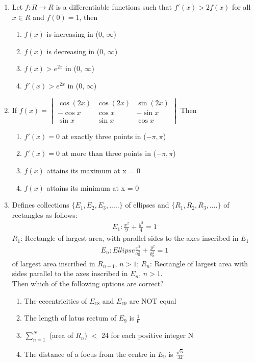 \begin{enumerate}[label=\arabic*.,ref=\thesubsection.\theenumi]
\item Let $f: R \to R$ is a differentiable functions such that $f'(x) > 2f(x)$ for all $x \in R$ and $f(0) = 1$, then 
\begin{enumerate}
\item $f(x)$ is increasing in (0, $\infty$)
\item $f(x)$ is decreasing in (0, $\infty$)
\item $f(x) >  e^{2x}$ in (0, $\infty$)
\item $f'(x) > e^{2x}$ in (0, $\infty$)
\end{enumerate}

\item If  
$f(x) = 
\begin{vmatrix}
\cos(2x) & \cos(2x) & \sin (2x) \\ 
-\cos x & \cos x & -\sin x  \\
\sin x & \sin x& \cos x 
\end{vmatrix}$
Then 
\begin{enumerate}
\item $f'(x) = 0$ at exactly three points in ($-\pi, \pi$)
\item $f'(x) = 0$ at more than three points in ($-\pi, \pi$)
\item $f(x)$ attains its maximum at x = 0
\item $f(x)$ attains its minimum at x = 0
\end{enumerate}

\item Defines collections $\{E_1, E_2, E_3,.....\}$ of ellipses and $\{R_1, R_2, R_3,....\}$ of rectangles as follows:
\begin{align}
E_1: 
\frac{x^2}{9} + \frac{y^2}{4} = 1
\end{align}
$R_1$: Rectangle of largest area, with parallel sides to the axes inscribed in $E_1$\\
\begin{align}
E_n: Ellipse \frac{x^2}{a_n^2} + \frac{y^2}{b_n^2} = 1
\end{align}
of largest area inscribed in $R_{n - 1}$, $n > 1$;
$R_n$: Rectangle of largest area with sides parallel to the axes inscribed in $E_n$, $n > 1$.\\
Then which of the following options are correct?
\begin{enumerate}
\item The eccentricities of $E_18$ and $E_19$ are NOT equal
\item The length of latus rectum of $E_9$ is $\frac{1}{6}$
\item $\sum_{n = 1}^N$ (area of $R_n$) $<$ 24 for each positive integer N
\item The distance of a focus from the centre in $E_9$ is $\frac{\sqrt{5}}{32}$
\end{enumerate}


\end{enumerate}
